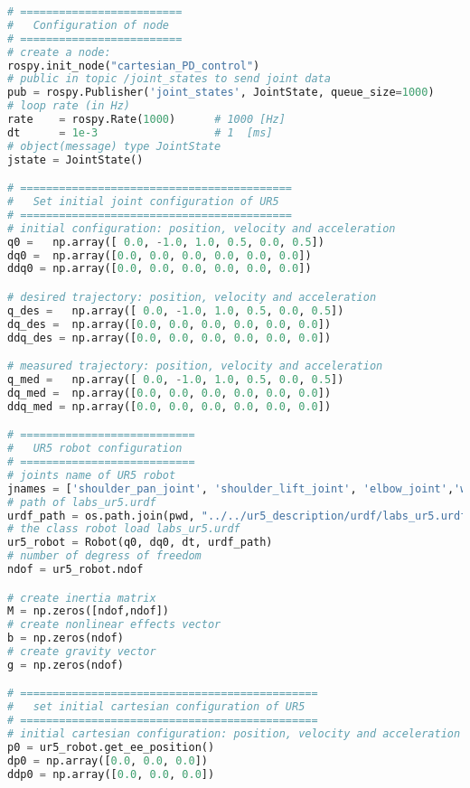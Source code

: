\begin{lstlisting}[language=Python,caption=Move the ur5 robot end-effector so that it follows the Cartesian sinusoidal reference trajectory of activity \ref{subsec:generate_sinusoidal_reference}., label={lst:cartesian_PD_control}]
# =========================
#   Configuration of node
# =========================
# create a node: 
rospy.init_node("cartesian_PD_control")
# public in topic /joint_states	to send joint data	
pub = rospy.Publisher('joint_states', JointState, queue_size=1000)
# loop rate (in Hz)
rate 	= rospy.Rate(1000)		# 1000 [Hz]
dt 		= 1e-3					# 1  [ms]
# object(message) type JointState
jstate = JointState()

# ==========================================
#   Set initial joint configuration of UR5
# ==========================================
# initial configuration: position, velocity and acceleration 
q0 =   np.array([ 0.0, -1.0, 1.0, 0.5, 0.0, 0.5])
dq0 =  np.array([0.0, 0.0, 0.0, 0.0, 0.0, 0.0]) 
ddq0 = np.array([0.0, 0.0, 0.0, 0.0, 0.0, 0.0]) 

# desired trajectory: position, velocity and acceleration
q_des =   np.array([ 0.0, -1.0, 1.0, 0.5, 0.0, 0.5])
dq_des =  np.array([0.0, 0.0, 0.0, 0.0, 0.0, 0.0]) 
ddq_des = np.array([0.0, 0.0, 0.0, 0.0, 0.0, 0.0]) 

# measured trajectory: position, velocity and acceleration
q_med =   np.array([ 0.0, -1.0, 1.0, 0.5, 0.0, 0.5])
dq_med =  np.array([0.0, 0.0, 0.0, 0.0, 0.0, 0.0]) 
ddq_med = np.array([0.0, 0.0, 0.0, 0.0, 0.0, 0.0]) 

# ===========================
#   UR5 robot configuration
# ===========================
# joints name of UR5 robot
jnames = ['shoulder_pan_joint', 'shoulder_lift_joint', 'elbow_joint','wrist_1_joint', 'wrist_2_joint', 'wrist_3_joint']
# path of labs_ur5.urdf
urdf_path = os.path.join(pwd, "../../ur5_description/urdf/labs_ur5.urdf")
# the class robot load labs_ur5.urdf
ur5_robot = Robot(q0, dq0, dt, urdf_path)
# number of degress of freedom
ndof = ur5_robot.ndof

# create inertia matrix 
M = np.zeros([ndof,ndof])
# create nonlinear effects vector
b = np.zeros(ndof)
# create gravity vector
g = np.zeros(ndof)

# ==============================================
#   set initial cartesian configuration of UR5
# ==============================================
# initial cartesian configuration: position, velocity and acceleration
p0 = ur5_robot.get_ee_position()
dp0 = np.array([0.0, 0.0, 0.0])
ddp0 = np.array([0.0, 0.0, 0.0])


\end{lstlisting}
